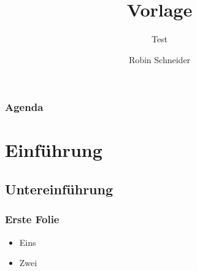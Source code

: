 \documentclass[
  ngerman,
  handout
]{beamer}
\title{Vorlage}
\subtitle{Test}
\author{Robin Schneider}
\date{\formatdate{22}{06}{2015}}
\begin{document}
\begin{frame}
  \titlepage%
\end{frame}

\begin{frame}
  \frametitle{Agenda}
  \tableofcontents[
    hideallsubsections,
  ]
\end{frame}

\section{Einführung}
\subsection{Untereinführung}
\begin{frame}[<+->][squeeze]
  \frametitle{Erste Folie}
  \begin{itemize}
    \item Eins
    \item Zwei
  \end{itemize}
\end{frame}

\end{document}

